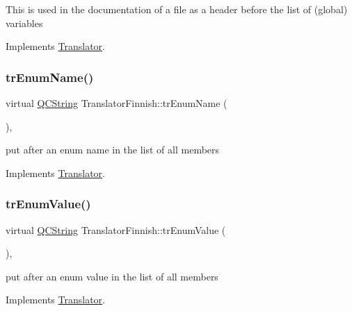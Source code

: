 This is used in the documentation of a file as a header before the list of (global) variables 

Implements \mbox{\hyperlink{class_translator}{Translator}}.

\mbox{\label{class_translator_finnish_a779a28340db0d8ca04f8e1560a9ec1b6}} 
\subsubsection{\texorpdfstring{trEnumName()}{trEnumName()}}
{\footnotesize\ttfamily virtual \mbox{\hyperlink{class_q_c_string}{Q\+C\+String}} Translator\+Finnish\+::tr\+Enum\+Name (\begin{DoxyParamCaption}{ }\end{DoxyParamCaption})\hspace{0.3cm}{\ttfamily [inline]}, {\ttfamily [virtual]}}

put after an enum name in the list of all members 

Implements \mbox{\hyperlink{class_translator}{Translator}}.

\mbox{\label{class_translator_finnish_a4f9924dbd6ff3b100101f3d011799c22}} 
\subsubsection{\texorpdfstring{trEnumValue()}{trEnumValue()}}
{\footnotesize\ttfamily virtual \mbox{\hyperlink{class_q_c_string}{Q\+C\+String}} Translator\+Finnish\+::tr\+Enum\+Value (\begin{DoxyParamCaption}{ }\end{DoxyParamCaption})\hspace{0.3cm}{\ttfamily [inline]}, {\ttfamily [virtual]}}

put after an enum value in the list of all members 

Implements \mbox{\hyperlink{class_translator}{Translator}}.

\mbox{\label{class_translator_finnish_a0d03fbc305d3e284d81606f79d1562c3}} 
